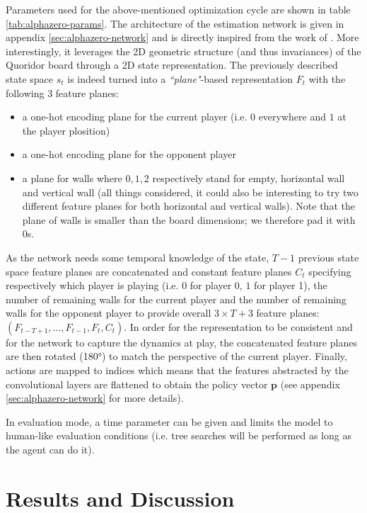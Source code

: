 \documentclass[journal, a4paper]{IEEEtran}
\begin{document}
    Parameters used for the above-mentioned optimization cycle are shown in table \ref{tab:alphazero-params}. The architecture of the estimation network is given in appendix \ref{sec:alphazero-network} and is directly inspired from the work of \cite{alphazero}. More interestingly, it leverages the 2D geometric structure (and thus invariances) of the Quoridor board through a 2D state representation. The previously described state space $s_t$ is indeed turned into a \textit{``plane"}-based representation $F_t$ with the following $3$ feature planes:
    \begin{itemize}
        \item a one-hot encoding plane for the current player (i.e. $0$ everywhere and $1$ at the player plosition)
        \item a one-hot encoding plane for the opponent player 
        \item a plane for walls where $0, 1, 2$ respectively stand for empty, horizontal wall and vertical wall (all things considered, it could also be interesting to try two different feature planes for both horizontal and vertical walls). Note that the plane of walls is smaller than the board dimensions; we therefore pad it with $0$s.
    \end{itemize}  
    As the network needs some temporal knowledge of the state, $T-1$ previous state space feature planes are concatenated and constant feature planes $C_t$ specifying respectively which player is playing (i.e. $0$ for player 0, $1$ for player 1), the number of remaining walls for the current player and the number of remaining walls for the opponent player to provide overall $3\times T + 3$ feature planes: $(F_{t-T+1}, \ldots, F_{t-1}, F_t, C_t)$. In order for the representation to be consistent and for the network to capture the dynamics at play, the concatenated feature planes are then rotated (180°) to match the perspective of the current player. Finally, actions are mapped to indices which means that the features abstracted by the convolutional layers are flattened to obtain the policy vector $\mathbf{p}$ (see appendix \ref{sec:alphazero-network} for more details).
    
    In evaluation mode, a time parameter can be given and limits the model to human-like evaluation conditions (i.e. tree searches will be performed as long as the agent can do it).


\section{Results and Discussion}
\label{sec:results}
\end{document}
